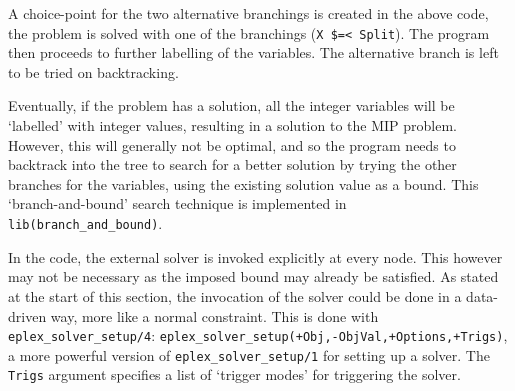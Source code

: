 A choice-point for the two alternative branchings is created in the above
code, the problem is solved with one of the branchings (\verb'X $=< Split').
The program then proceeds to further labelling of the variables. The
alternative branch is left to be tried on backtracking.


Eventually, if the problem has a solution, all the integer
variables will be `labelled' with integer values, resulting in a solution to the
MIP problem. However, this will generally not be optimal, and so the program
needs to backtrack into the tree to search for a better solution by trying
the other branches for the variables, using the
existing solution value as a bound.
This `branch-and-bound' search technique is implemented in {\tt
lib(branch_and_bound)}.


\begin{sloppypar}
In the code, the external solver is invoked explicitly at every node. This
however may not be necessary as the imposed bound may already be satisfied.
As stated at the start of this section, the invocation of the solver could be done in a
data-driven way, more like a normal constraint.
This is done with \verb'eplex_solver_setup/4':
\verb'eplex_solver_setup(+Obj,-ObjVal,+Options,+Trigs)', a more
powerful version of \verb'eplex_solver_setup/1' for setting up a
solver. The \verb'Trigs' argument specifies a list of `trigger
modes' for triggering the solver. 
\end{sloppypar}

